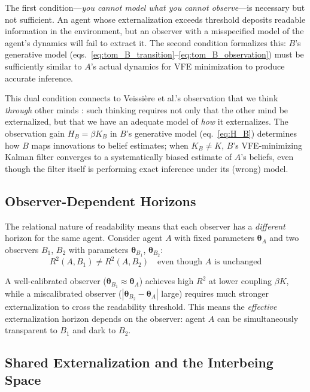 \documentclass[runningheads]{llncs}
\begin{document}
The first condition---\emph{you cannot model what you cannot observe}---is necessary but not sufficient. An agent whose externalization exceeds threshold deposits readable information in the environment, but an observer with a misspecified model of the agent's dynamics will fail to extract it. The second condition formalizes this: $B$'s generative model (eqs.~\ref{eq:tom_B_transition}--\ref{eq:tom_B_observation}) must be sufficiently similar to $A$'s actual dynamics for VFE minimization to produce accurate inference.

This dual condition connects to Veissi\`{e}re et al.'s observation that we think \emph{through} other minds \cite{veissiere2020thinking}: such thinking requires not only that the other mind be externalized, but that we have an adequate model of \emph{how} it externalizes. The observation gain $H_B = \beta K_B$ in $B$'s generative model (eq.~\ref{eq:H_B}) determines how $B$ maps innovations to belief estimates; when $K_B \neq K$, $B$'s VFE-minimizing Kalman filter converges to a systematically biased estimate of $A$'s beliefs, even though the filter itself is performing exact inference under its (wrong) model.

\subsection{Observer-Dependent Horizons}
\label{sec:observer_horizons}

The relational nature of readability means that each observer has a \emph{different} horizon for the same agent. Consider agent $A$ with fixed parameters $\boldsymbol{\theta}_A$ and two observers $B_1$, $B_2$ with parameters $\boldsymbol{\theta}_{B_1}$, $\boldsymbol{\theta}_{B_2}$:
\begin{equation}
    R^2(A, B_1) \neq R^2(A, B_2) \quad \text{even though } A \text{ is unchanged}
    \label{eq:observer_dependent}
\end{equation}

A well-calibrated observer ($\boldsymbol{\theta}_{B_1} \approx \boldsymbol{\theta}_A$) achieves high $R^2$ at lower coupling $\beta K$, while a miscalibrated observer ($|\boldsymbol{\theta}_{B_2} - \boldsymbol{\theta}_A|$ large) requires much stronger externalization to cross the readability threshold. This means the \emph{effective} externalization horizon depends on the observer: agent $A$ can be simultaneously transparent to $B_1$ and dark to $B_2$.

\subsection{Shared Externalization and the Interbeing Space}
\end{document}
